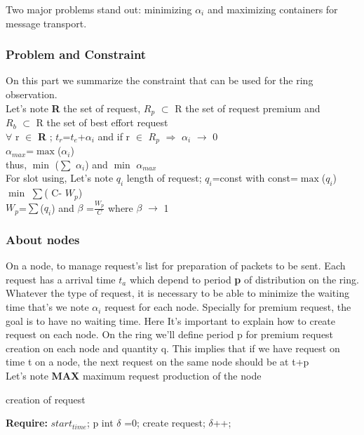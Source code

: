 \documentclass{article}
\begin{document}
Two major problems stand out: minimizing {$\alpha_{i}$} and maximizing containers for message transport.


\subsubsection{Problem and Constraint}
On this part we summarize the constraint that can be used for the ring observation.\\
Let's note \textbf{R} the set of request, \textbf{$R_{p}$} $\subset$ R the set of request premium and  \\ \textbf{$R_{b}$} $\subset$ R the set of best effort request\\


$\forall$ r $\in$ \textbf{R} ;  {$t_{r}$}={$t_{e}$}+{$\alpha_{i}$} and  if  r $\in$ {$R_{p}$} $\Rightarrow$ {$\alpha_{i}$} $\rightarrow$ 0\\

{$\alpha_{max}$}=$\max$({$\alpha_{i}$})\\

thus,   $\min$ ($\sum$ {$\alpha_{i}$}) and $\min$  {$\alpha_{max}$}\\

For slot using, Let's note  \textbf{$q_{i}$} length of request;
{$q_{i}$}=const with const=$\max$({$q_{i}$})\\


     $\min$ $\sum$( C- {$W_{p}$})\\
{$W_{p}$}=$\sum$({$q_{i}$}) and $\beta$ =$ \frac{W_{p}}{C} $  where  $\beta$  $\rightarrow$ 1\\
 	
 
\subsubsection{About nodes} 
On a node, to manage request's list for preparation of packets to be sent. Each request has a arrival time  \textbf{$t_{a}$} which depend to period \textbf{p} of distribution on the ring.\\
 Whatever the type of request, it is necessary to be able to minimize the waiting time that's we note {$\alpha_{i}$} request for each node. Specially for premium request, the goal is to have no waiting time. Here It's important to explain how to create request on each node. On the ring we'll define period p for premium request creation on each node and quantity q. This implies that if we have request on time t on a node, the next request on the same node should be at t+p \\ 
Let's note  \textbf{MAX} maximum request production of the node 
\begin{algorithm}

\caption{creation of request}
\begin{algorithmic}
\State \textbf{Require:}  $start_{time}$; p
\State int $\delta$ =0;
\State create request;
\State $\delta$++;
\EndIf
\EndWhile
\end{algorithmic}
\end{algorithm}  \\
\end{document}
